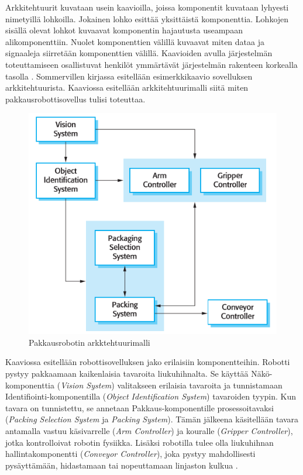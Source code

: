 \documentclass[utf8]{gradu3}
\begin{document}
Arkkitehtuurit kuvataan usein kaavioilla, joissa komponentit kuvataan lyhyesti nimetyillä lohkoilla. Jokainen lohko esittää yksittäistä komponenttia. Lohkojen sisällä olevat lohkot kuvaavat komponentin hajautusta useampaan alikomponenttiin. Nuolet komponenttien välillä kuvaavat miten dataa ja signaaleja siirretään komponenttien välillä. Kaavioiden avulla järjestelmän toteuttamiseen osallistuvat henkilöt ymmärtävät järjestelmän rakenteen korkealla tasolla \parencite[s. 150]{Sommerville}. Sommervillen kirjassa esitellään esimerkkikaavio sovelluksen arkkitehtuurista. Kaaviossa esitellään arkkitehtuurimalli siitä miten pakkausrobottisovellus tulisi toteuttaa.


\begin{figure}[h]
\centering
\includegraphics[scale=0.85]{architecture.png}
\caption{Pakkausrobotin arkktehtuurimalli \parencite[s.149]{Sommerville}}
\end{figure}


Kaaviossa esitellään robottisovelluksen jako erilaisiin komponentteihin. Robotti pystyy pakkaamaan kaikenlaisia tavaroita liukuhihnalta. Se käyttää Näkö-komponenttia (\emph{Vision System}) valitakseen erilaisia tavaroita ja tunnistamaan Identifiointi-komponentilla (\emph{Object Identification System}) tavaroiden tyypin. Kun tavara on tunnistettu, se annetaan Pakkaus-komponentille prosessoitavaksi (\emph{Packing Selection System} ja \emph{Packing System}). Tämän jälkeena käsitellään tavara antamalla vastuu käsivarrelle (\emph{Arm Controller}) ja kouralle (\emph{Gripper Controller}), jotka kontrolloivat robotin fysiikka. Lisäksi robotilla tulee olla liukuhihnan hallintakomponentti (\emph{Conveyor Controller}), joka pystyy mahdollisesti pysäyttämään, hidastamaan tai nopeuttamaan linjaston kulkua \parencite[s.148]{Sommerville}.
\end{document}
